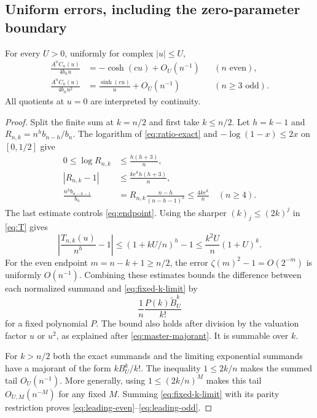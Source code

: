 \subsection{Uniform errors, including the zero-parameter boundary}

\begin{theorem}
\label{thm:leading-rate}
For every $U>0$, uniformly for complex $|u|\le U$,
\begin{align}
 \frac{A^nC_n(u)}{4b_nu}&=-\cosh(cu)+O_U(n^{-1})
       &&(n\text{ even}),\label{eq:leading-even}\\
 \frac{A^nC_n(u)}{4b_nu^2}&=\frac{\sinh(cu)}u+O_U(n^{-1})
       &&(n\ge3\text{ odd}).\label{eq:leading-odd}
\end{align}
All quotients at $u=0$ are interpreted by continuity.
\end{theorem}
\begin{proof}
Split the finite sum at $k=n/2$ and first take $k\le n/2$. Let
$h=k-1$ and $R_{n,k}=n^hb_{n-h}/b_n$. The logarithm of
\eqref{eq:ratio-exact} and $-\log(1-x)\le2x$ on $[0,1/2]$ give
\begin{align}
 0\le\log R_{n,k}&\le\frac{h(h+3)}n,\nonumber\\
 |R_{n,k}-1|&\le\frac{ke^kh(h+3)}n,\label{eq:ratio-rate}\\
 \frac{n^hb_{n-h-1}}{b_n}
 &=R_{n,k}\frac{n-h}{(n-h-1)^2}
 \le\frac{4ke^k}{n}\quad(n\ge4).\nonumber
\end{align}
The last estimate controls \eqref{eq:endpoint}. Using the sharper
$(k)_j\le(2k)^j$ in \eqref{eq:T} gives
\begin{equation}\label{eq:T-rate}
 \left|\frac{T_{n,k}(u)}{n^h}-1\right|
 \le(1+kU/n)^h-1
 \le\frac{k^2U}{n}(1+U)^k.
\end{equation}
For the even endpoint $m=n-k+1\ge n/2$, the error
$\zeta(m)^2-1=O(2^{-m})$ is uniformly $O(n^{-1})$.
Combining these estimates bounds the difference between each normalized
summand and \eqref{eq:fixed-k-limit} by
\[
 \frac1n\frac{P(k)\widetilde B_U^k}{k!}
\]
for a fixed polynomial $P$. The bound also holds after division by the
valuation factor $u$ or $u^2$, as explained after
\eqref{eq:master-majorant}. It is summable over $k$.

For $k>n/2$ both the exact summands and the limiting exponential summands
have a majorant of the form $kB_U^k/k!$. The inequality $1\le2k/n$ makes
the summed tail $O_U(n^{-1})$. More generally, using
$1\le(2k/n)^M$ makes this tail $O_{U,M}(n^{-M})$ for any fixed $M$.
Summing \eqref{eq:fixed-k-limit} with its parity restriction proves
\eqref{eq:leading-even}--\eqref{eq:leading-odd}.
\end{proof}

